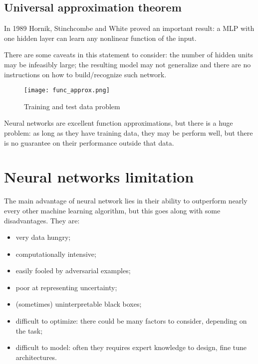 \subsection{Universal approximation theorem}

In 1989 Hornik, Stinchcombe and White proved an important result: a MLP with one hidden layer can learn any nonlinear function of the input.

There are some caveats in this statement to consider: the number of hidden units may be infeasibly large; the resulting model may not generalize and there are no instructions on how to build/recognize such network.

\begin{figure}[H]
  \centering
  \texttt{[image: func\_approx.png]}
  \caption{Training and test data problem}
\end{figure}

Neural networks are excellent function approximations, but there is a huge
problem: as long as they have training data, they may be perform well, but
there is no guarantee on their performance outside that data.

\section{Neural networks limitation}

The main advantage of neural network lies in their ability to outperform nearly every other machine learning algorithm, but this goes along with some disadvantages. They are:

\begin{itemize}
 \item very data hungry;
 \item computationally intensive;
 \item easily fooled by adversarial examples;
 \item poor at representing uncertainty;
 \item (sometimes) uninterpretable black boxes;
 \item difficult to optimize: there could be many factors to consider, depending on the task;
 \item difficult to model: often they requires expert knowledge to design, fine tune architectures.
\end{itemize}
